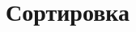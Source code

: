 \documentclass[12pt, a4paper]{article}
\begin{document}























\newpage
\section{Сортировка}

\end{document}
